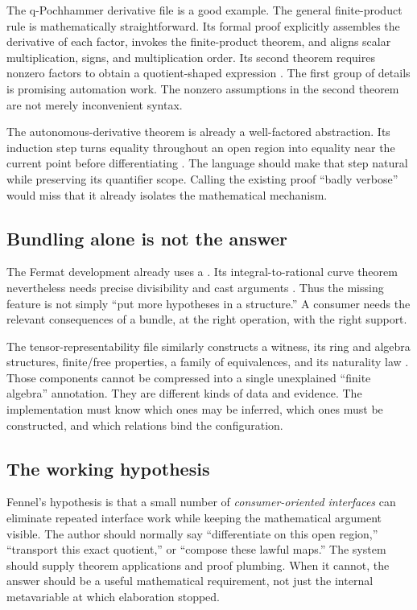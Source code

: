 \documentclass[11pt,a4paper]{article}
\theoremstyle{definition}
\theoremstyle{remark}
\newcommand{\code}[1]{\texttt{\detokenize{#1}}}
\begin{document}
The q-Pochhammer derivative file is a good example. The general finite-product
rule is mathematically straightforward. Its formal proof explicitly assembles
the derivative of each factor, invokes the finite-product theorem, and aligns
scalar multiplication, signs, and multiplication order. Its second theorem
requires nonzero factors to obtain a quotient-shaped expression
\cite{qpoch}. The first group of details is promising automation work. The
nonzero assumptions in the second theorem are not merely inconvenient syntax.

The autonomous-derivative theorem is already a well-factored abstraction. Its
induction step turns equality throughout an open region into equality near the
current point before differentiating \cite{ode}. The language should make that
step natural while preserving its quantifier scope. Calling the existing proof
``badly verbose'' would miss that it already isolates the mathematical mechanism.

\subsection{Bundling alone is not the answer}
The Fermat development already uses a \code{FreyPackage}. Its integral-to-rational
curve theorem nevertheless needs precise divisibility and cast arguments
\cite{frey}. Thus the missing feature is not simply ``put more hypotheses in a
structure.'' A consumer needs the relevant consequences of a bundle, at the
right operation, with the right support.

The tensor-representability file similarly constructs a witness, its ring and
algebra structures, finite/free properties, a family of equivalences, and its
naturality law \cite{tensor}. Those components cannot be compressed into a
single unexplained ``finite algebra'' annotation. They are different kinds of
data and evidence. The implementation must know which ones may be inferred,
which ones must be constructed, and which relations bind the configuration.

\subsection{The working hypothesis}
Fennel's hypothesis is that a small number of \emph{consumer-oriented interfaces}
can eliminate repeated interface work while keeping the mathematical argument
visible. The author should normally say ``differentiate on this open region,''
``transport this exact quotient,'' or ``compose these lawful maps.'' The system
should supply theorem applications and proof plumbing. When it cannot, the
answer should be a useful mathematical requirement, not just the internal
metavariable at which elaboration stopped.
\end{document}
